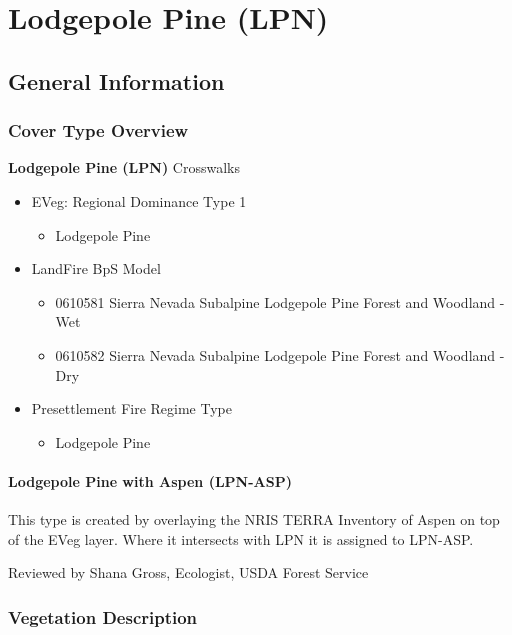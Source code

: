 \newpage
\section{Lodgepole Pine (LPN)}

\subsection*{General Information}

\subsubsection{Cover Type Overview}

\textbf{Lodgepole Pine (LPN)}
\newline
Crosswalks
\begin{itemize}
	\item EVeg: Regional Dominance Type 1
	\begin{itemize}
		\item Lodgepole Pine
	\end{itemize}

	\item LandFire BpS Model
	\begin{itemize}
		\item 0610581 Sierra Nevada Subalpine Lodgepole Pine Forest and Woodland - Wet
		\item 0610582 Sierra Nevada Subalpine Lodgepole Pine Forest and Woodland - Dry

	\end{itemize}

	\item Presettlement Fire Regime Type
	\begin{itemize}
		\item Lodgepole Pine
	\end{itemize}
\end{itemize}

\paragraph{Lodgepole Pine with Aspen (LPN-ASP)}
This type is created by overlaying the NRIS TERRA Inventory of Aspen on top of the EVeg layer. Where it intersects with LPN it is assigned to LPN-ASP.
\newline

\noindent Reviewed by Shana Gross, Ecologist, USDA Forest Service

\subsubsection{Vegetation Description}
